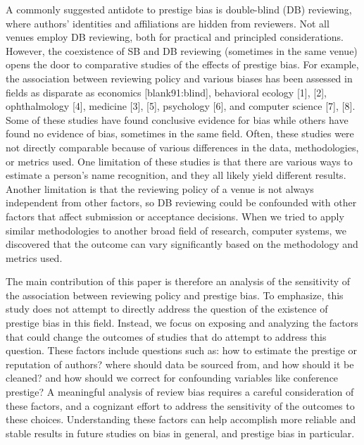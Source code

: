 \documentclass[12pt]{article}
\begin{document}
A commonly suggested antidote to prestige bias is double-blind (DB) reviewing, where authors' identities and affiliations are hidden from reviewers.
Not all venues employ DB reviewing, both for practical and principled considerations.
However, the coexistence of SB and DB reviewing (sometimes in the same venue) opens the door to comparative studies of the effects of prestige bias.
For example, the association between reviewing policy and various biases has been assessed in fields as disparate as economics {[}blank91:blind{]}, behavioral ecology {[}1{]}, {[}2{]}, ophthalmology {[}4{]}, medicine {[}3{]}, {[}5{]}, psychology {[}6{]}, and computer science {[}7{]}, {[}8{]}.
Some of these studies have found conclusive evidence for bias while others have found no evidence of bias, sometimes in the same field.
Often, these studies were not directly comparable because of various differences in the data, methodologies, or metrics used.
One limitation of these studies is that there are various ways to estimate a person's name recognition, and they all likely yield different results.
Another limitation is that the reviewing policy of a venue is not always independent from other factors, so DB reviewing could be confounded with other factors that affect submission or acceptance decisions.
When we tried to apply similar methodologies to another broad field of research, computer systems, we discovered that the outcome can vary significantly based on the methodology and metrics used.

The main contribution of this paper is therefore an analysis of the sensitivity of the association between reviewing policy and prestige bias.
To emphasize, this study does not attempt to directly address the question of the existence of prestige bias in this field.
Instead, we focus on exposing and analyzing the factors that could change the outcomes of studies that do attempt to address this question.
These factors include questions such as: how to estimate the prestige or reputation of authors? where should data be sourced from, and how should it be cleaned? and how should we correct for confounding variables like conference prestige?
A meaningful analysis of review bias requires a careful consideration of these factors, and a cognizant effort to address the sensitivity of the outcomes to these choices.
Understanding these factors can help accomplish more reliable and stable results in future studies on bias in general, and prestige bias in particular.
\end{document}
